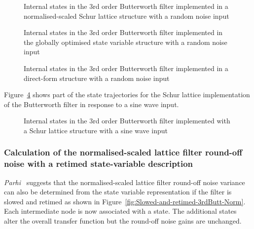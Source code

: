 \documentclass[a4paper,twoside,10pt,english]{report}
\begin{document}
\begin{figure}[!htbp]
\begin{center}
\scalebox{0.7}{}
\caption{Internal states in the 3rd order Butterworth filter implemented 
in a normalised-scaled Schur lattice structure with a random noise input}
\label{fig:State-variables-butt3NS-noise-schur-lattice}
\end{center}
\end{figure}
\begin{figure}[!htbp]
\begin{center}
\scalebox{0.7}{}
\caption{Internal states in the 3rd order Butterworth filter implemented 
in the globally optimised state variable structure with a random noise input}
\label{fig:State-variables-butt3NS-noise-global-optimum}
\end{center}
\end{figure}
\begin{figure}[!htbp]
\begin{center}
\scalebox{0.7}{}
\caption{Internal states in the 3rd order Butterworth filter implemented 
in a direct-form structure with a random noise input}
\label{fig:State-variables-butt3NS-noise-direct-form}
\end{center}
\end{figure}

Figure~\ref{fig:State-variables-butt3NS-sine-schur-lattice} 
shows part of the state trajectories for the Schur lattice implementation of
the Butterworth filter in response to a sine wave input.

\begin{figure}[!htbp]
\begin{center}
\scalebox{0.7}{}
\caption{Internal states in the 3rd order Butterworth filter implemented 
with a Schur lattice structure with a sine wave input}
\label{fig:State-variables-butt3NS-sine-schur-lattice}
\end{center}
\end{figure}

\clearpage
\subsubsection{\label{sec:Calc-normalised-scaled-round-off-noise-retimed-state-variable}Calculation of the normalised-scaled lattice filter round-off noise with a retimed state-variable description}
\emph{Parhi}~\cite[Chapter 12, p. 450]{Parhi_VLSIDigitalSignalProcessingSystems} 
suggests that the normalised-scaled lattice filter round-off noise variance can
also be determined from the state variable representation if the filter is
slowed and retimed as shown in Figure~\ref{fig:Slowed-and-retimed-3rdButt-Norm}.
Each intermediate node is now associated with a state. The additional states
alter the overall transfer function but the round-off noise gains are unchanged.
\end{document}
